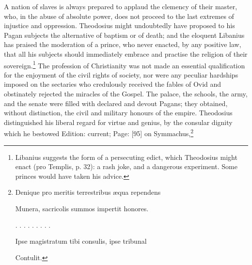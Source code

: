 A nation of slaves is always prepared to applaud the clemency of their master, who, in the abuse of absolute power, does not proceed to the last extremes of injustice and oppression. Theodosius might undoubtedly have proposed to his Pagan subjects the alternative of baptism or of death; and the eloquent Libanius has praised the moderation of a prince, who never enacted, by any positive law, that all his subjects should immediately embrace and practise the religion of their sovereign.\footnote{Libanius suggests the form of a persecuting edict, which Theodosius might enact (pro Templis, p. 32): a rash joke, and a dangerous experiment. Some princes would have taken his advice.} The profession of Christianity was not made an essential qualification for the enjoyment of the civil rights of society, nor were any peculiar hardships imposed on the sectaries who credulously received the fables of Ovid and obstinately rejected the miracles of the Gospel. The palace, the schools, the army, and the senate were filled with declared and devout Pagans; they obtained, without distinction, the civil and military honours of the empire. Theodosius distinguished his liberal regard for virtue and genius, by the consular dignity which he bestowed Edition: current; Page: [95] on Symmachus,\footnote{Denique pro meritis terrestribus æqua rependens

Munera, sacricolis summos impertit honores.

. . . . . . . . .

Ipse magistratum tibi consulis, ipse tribunal

Contulit.

}
